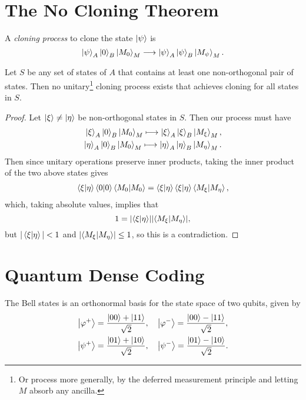 \documentclass[a4paper]{amsart}
\begin{document}
\section{The No Cloning Theorem}

A \emph{cloning process} to clone the state $\ket{\psi}$ is
$$
\ket{\psi}_A \ket{0}_B \ket{M_0}_M \longrightarrow \ket{\psi}_A \ket{\psi}_B \ket{M_\psi}_M.
$$

\begin{theorem}
  Let $S$ be any set of states of $A$ that contains at least one non-orthogonal pair of states. Then no unitary\footnote{Or process more generally, by the deferred measurement principle and letting $M$ absorb any ancilla.} cloning process exists that achieves cloning for all states in $S$.
\end{theorem}
\begin{proof}
Let $\ket{\xi} \neq \ket{\eta}$ be non-orthogonal states in $S$. Then our process must have
\begin{align*}
  \ket{\xi}_A \ket{0}_B \ket{M_0}_M \longmapsto \ket{\xi}_A \ket{\xi}_B \ket{M_\xi}_M, \\
  \ket{\eta}_A \ket{0}_B \ket{M_0}_M \longmapsto \ket{\eta}_A \ket{\eta}_B \ket{M_\eta}_M.
\end{align*}
Then since unitary operations preserve inner products, taking the inner product of the two above states gives
\begin{align*}
\ip{\xi}{\eta} \ip{0}{0} \ip{M_0}{M_0} = \ip{\xi}{\eta}\ip{\xi}{\eta} \ip{M_\xi}{M_\eta},
\end{align*}
which, taking absolute values, implies that 
$$1 = \abs{\ip{\xi}{\eta}} \abs{\ip{M_\xi}{M_\eta}},$$
but $|\ip{\xi}{\eta}| < 1$ and $\abs{\ip{M_\xi}{M_\eta}} \leq 1$, so this is a contradiction.
\end{proof}

\section{Quantum Dense Coding}

\begin{definition}
  The Bell states is an orthonormal basis for the state space of two qubits, given by
  \begin{align*}
    \ket{\varphi^+} &= \frac{\ket{00} + \ket{11}}{\sqrt{2}}, \quad \ket{\varphi^-} = \frac{\ket{00} - \ket{11}}{\sqrt{2}}, \\
    \ket{\psi^+} &= \frac{\ket{01} + \ket{10}}{\sqrt{2}}, \quad \ket{\psi^-} = \frac{\ket{01} - \ket{10}}{\sqrt{2}}.
  \end{align*}
\end{definition}
\end{document}
